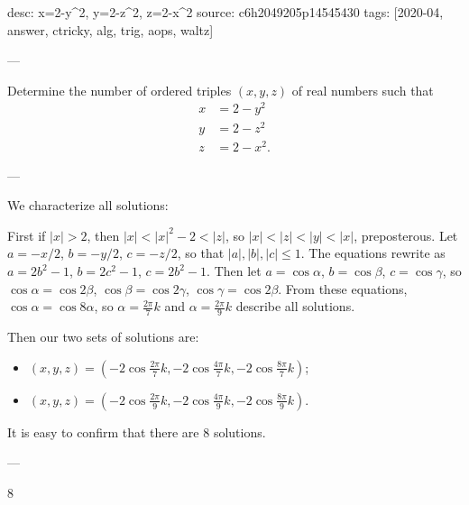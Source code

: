 desc: x=2-y^2, y=2-z^2, z=2-x^2
source: c6h2049205p14545430
tags: [2020-04, answer, ctricky, alg, trig, aops, waltz]

---

Determine the number of ordered triples $(x,y,z)$ of real numbers such that
\begin{align*}
    x&=2-y^2\\
    y&=2-z^2\\
    z&=2-x^2.
\end{align*}

---

We characterize all solutions:

First if $|x|>2$, then $|x|<|x|^2-2<|z|$, so $|x|<|z|<|y|<|x|$, preposterous. Let $a=-x/2$, $b=-y/2$, $c=-z/2$, so that $|a|,|b|,|c|\le1$. The equations rewrite as $a=2b^2-1$, $b=2c^2-1$, $c=2b^2-1$. Then let $a=\cos\alpha$, $b=\cos\beta$, $c=\cos\gamma$, so $\cos\alpha=\cos2\beta$, $\cos\beta=\cos2\gamma$, $\cos\gamma=\cos2\beta$. From these equations, $\cos\alpha=\cos8\alpha$, so $\alpha=\tfrac{2\pi}7k$ and $\alpha=\tfrac{2\pi}9k$ describe all solutions.

Then our two sets of solutions are:
\begin{itemize}
    \item $(x,y,z)=(-2\cos\tfrac{2\pi}7k,-2\cos\tfrac{4\pi}7k,-2\cos\tfrac{8\pi}7k)$;
    \item $(x,y,z)=(-2\cos\tfrac{2\pi}9k,-2\cos\tfrac{4\pi}9k,-2\cos\tfrac{8\pi}9k)$.
\end{itemize}
It is easy to confirm that there are $8$ solutions.

---

8
